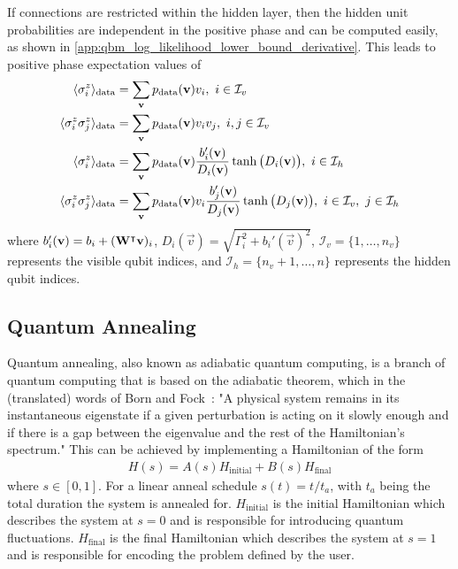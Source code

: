 If connections are restricted within the hidden layer, then the hidden unit probabilities are independent in the positive phase and can be computed easily, as shown in \cref{app:qbm_log_likelihood_lower_bound_derivative}.
This leads to positive phase expectation values of
\begin{align}
\begin{split}
    \langle \sigma_i^z \rangle_\text{data}
        &= \sum_{\mathbf{v}} p_{\text{data}}(\mathbf{v}) v_i,
        \ i \in \mathcal{I}_v \\
    \langle \sigma_i^z \sigma_j^z \rangle_\text{data}
        &= \sum_{\mathbf{v}} p_{\text{data}}(\mathbf{v}) v_i v_j,
        \ i, j \in \mathcal{I}_v \\
    \langle \sigma_i^z \rangle_\text{data}
        &= \sum_{\mathbf{v}} p_{\text{data}}(\mathbf{v}) \frac{b_i'(\mathbf{v})}{D_i(\mathbf{v})} \tanh\big(D_i(\mathbf{v})\big),
        \ i \in \mathcal{I}_h \\
    \langle \sigma_i^z \sigma_j^z \rangle_\text{data}
        &= \sum_{\mathbf{v}} p_{\text{data}}(\mathbf{v}) v_i \frac{b_j'(\mathbf{v})}{D_j(\mathbf{v})} \tanh\big(D_j(\mathbf{v})\big),
        \ i \in \mathcal{I}_v, \ j \in \mathcal{I}_h
\end{split}
\end{align}
where \( b_i'(\mathbf{v}) = b_i + (\mathbf{W}^\intercal\mathbf{v})_i \), \( D_i(\vec{v}) = \sqrt{\Gamma_i^2 + b_i'(\vec{v})^2} \), \( \mathcal{I}_v = \{1, \dots, n_v\} \) represents the visible qubit indices, and \( \mathcal{I}_h = \{n_v + 1, \dots, n\} \) represents the hidden qubit indices.

\subsection{Quantum Annealing}\label{sec:quantum_annealing}
Quantum annealing, also known as adiabatic quantum computing, is a branch of quantum computing that is based on the adiabatic theorem, which in the (translated) words of Born and Fock~\cite{born_fock_1928}:
"A physical system remains in its instantaneous eigenstate if a given perturbation is acting on it slowly enough and if there is a gap between the eigenvalue and the rest of the Hamiltonian's spectrum."
This can be achieved by implementing a Hamiltonian of the form~\cite{qc_lecture_notes}
\begin{align}
    H(s) = A(s) H_{\text{initial}} + B(s) H_{\text{final}}
\end{align}
where \( s \in [0, 1] \).
For a linear anneal schedule \( s(t) = t / t_a \), with \( t_a \) being the total duration the system is annealed for.
\( H_{\text{initial}} \) is the initial Hamiltonian which describes the system at \( s = 0 \) and is responsible for introducing quantum fluctuations.
\( H_{\text{final}} \) is the final Hamiltonian which describes the system at \( s = 1 \) and is responsible for encoding the problem defined by the user.

